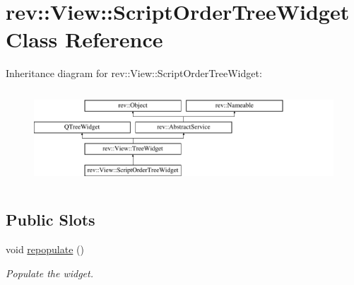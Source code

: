 \hypertarget{classrev_1_1_view_1_1_script_order_tree_widget}{}\section{rev\+::View\+::Script\+Order\+Tree\+Widget Class Reference}
\label{classrev_1_1_view_1_1_script_order_tree_widget}
Inheritance diagram for rev\+::View\+::Script\+Order\+Tree\+Widget\+:\begin{figure}[H]
\begin{center}
\leavevmode
\includegraphics[height=3.555556cm]{classrev_1_1_view_1_1_script_order_tree_widget}
\end{center}
\end{figure}
\subsection*{Public Slots}
\begin{DoxyCompactItemize}
\item 
\mbox{\label{classrev_1_1_view_1_1_script_order_tree_widget_a5ef1cc506477178defda2023995695d4}} 
void \mbox{\hyperlink{classrev_1_1_view_1_1_script_order_tree_widget_a5ef1cc506477178defda2023995695d4}{repopulate}} ()
\begin{DoxyCompactList}\small\item\em Populate the widget. \end{DoxyCompactList}\end{DoxyCompactItemize}
